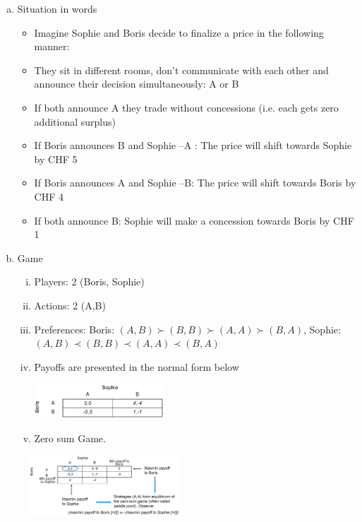 \begin{enumerate}[a)]
    \item Situation in words
        \begin{itemize}
            \item Imagine Sophie and Boris decide to finalize a price in the following manner:
            \item They sit in different rooms, don’t communicate with each other and announce their decision simultaneously: A or B
            \item If both announce A they trade without concessions (i.e. each gets zero additional surplus)
            \item If Boris announces B and Sophie –A : The price will shift towards Sophie by CHF 5
            \item If Boris announces A and Sophie –B: The price will shift towards Boris by CHF 4
            \item If both announce B: Sophie will make a concession towards Boris by CHF 1
        \end{itemize}
    \item Game
        \begin{enumerate}[(i)]
            \item Players: 2 (Boris, Sophie)
            \item Actions: 2 (A,B)
            \item Preferences: Boris: $(A,B) \succ (B,B) \succ (A,A) \succ (B,A)$,
                Sophie: $(A,B) \prec (B,B) \prec (A,A) \prec (B,A)$
            \item Payoffs are presented in the normal form below
            
                \includegraphics[width=0.4\textwidth]{Pictures/boris_sophie_game.png}
            \item Zero sum Game.
        \end{enumerate}
\end{enumerate}

\begin{figure}[H]
    \centering
    \includegraphics[width=0.5\textwidth]{Pictures/maxim_analysis_saddle_point.png}
\end{figure}

